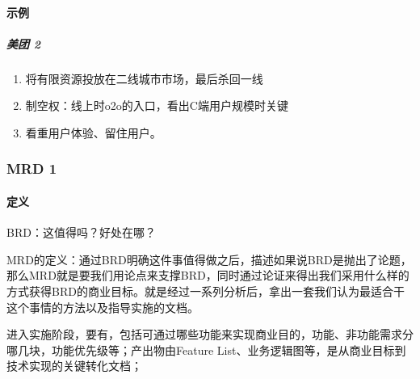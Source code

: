 \documentclass[letterpaper,10pt,english]{sphinxmanual}
\begin{document}
\paragraph{示例}
\label{\detokenize{chapter_knowledge/compete_analysis:id8}}

\subparagraph{美团 2\sphinxfootnotemark[556]}
\label{\detokenize{chapter_knowledge/compete_analysis:id9}}%
\begin{footnotetext}[556]\sphinxAtStartFootnote
{}
%
\end{footnotetext}\ignorespaces \begin{enumerate}
%
\item {} 
将有限资源投放在二线城市市场，最后杀回一线

\item {} 
制空权：线上时o2o的入口，看出C端用户规模时关键

\item {} 
看重用户体验、留住用户。

\end{enumerate}


\subsubsection{MRD 1\sphinxfootnotemark[557]}
\label{\detokenize{chapter_knowledge/MRD:mrd-1}}\label{\detokenize{chapter_knowledge/MRD::doc}}%
\begin{footnotetext}[557]\sphinxAtStartFootnote
{}
%
\end{footnotetext}\ignorespaces 

\paragraph{定义}
\label{\detokenize{chapter_knowledge/MRD:id1}}
BRD：这值得吗？好处在哪？

MRD的定义：通过BRD明确这件事值得做之后，描述如果说BRD是抛出了论题，那么MRD就是要我们用论点来支撑BRD，同时通过论证来得出我们采用什么样的方式获得BRD的商业目标。就是经过一系列分析后，拿出一套我们认为最适合干这个事情的方法以及指导实施的文档。

进入实施阶段，要有，包括可通过哪些功能来实现商业目的，功能、非功能需求分哪几块，功能优先级等；产出物由Feature
List、业务逻辑图等，是从商业目标到技术实现的关键转化文档；%
\begin{footnote}[558]\sphinxAtStartFootnote
{}
%
\end{footnote}
\end{document}
